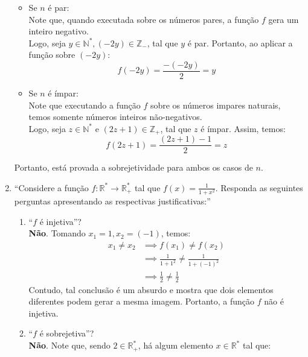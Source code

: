 \documentclass[13pt,letterpaper]{article}
\begin{document}
\begin{enumerate}
        \begin{itemize}
            \item Se $n$ é par: \\
            Note que, quando executada sobre os números pares, a função $f$ gera um inteiro negativo. \\
            Logo, seja $y \in \mathbb{N}^*, (-2y) \in \mathbb{Z}_-$, tal que $y$ é par. Portanto, ao aplicar a função sobre $(-2y)$:
            \begin{displaymath}
                f(-2y) = \frac{-(-2y)}{2} = y
            \end{displaymath}
            \item Se $n$ é ímpar: \\
            Note que executando a função $f$ sobre os números impares naturais, temos somente números inteiros não-negativos. \\
            Logo, seja $z \in \mathbb{N}^*$ e $(2z + 1) \in \mathbb{Z}_+$, tal que $z$ é ímpar. Assim, temos:
            \begin{displaymath}
                f(2z + 1) = \frac{(2z + 1) - 1}{2} = z
            \end{displaymath}
        \end{itemize}
        Portanto, está provada a sobrejetividade para ambos os casos de $n$.
    \item \enquote{Considere a função $f: \mathbb{R}^* \rightarrow \mathbb{R}^*_+$ tal que $f(x) = \frac{1}{1 + x^2}$. Responda as seguintes perguntas apresentando as respectivas justificativas:}
    \begin{enumerate}
        \item \enquote{$f$ é injetiva}? \\
        \textbf{Não}. Tomando $x_1 = 1, x_2 = (-1)$, temos:
        \begin{align*}
            x_1 \ne x_2 &\implies f(x_1) \ne f(x_2) \\ &\implies 
            \frac{1}{1 + 1^2} \ne \frac{1}{1 + (-1)^2} \\ &\implies
            \frac{1}{2} \ne \frac{1}{2}
        \end{align*}
        Contudo, tal conclusão é um absurdo e mostra que dois elementos diferentes podem gerar a mesma imagem. Portanto, a função $f$ não é injetiva.
        \item \enquote{$f$ é sobrejetiva}? \\
        \textbf{Não}. Note que, sendo $2 \in \mathbb{R}^*_+$, há algum elemento $x \in \mathbb{R}^*$ tal que:

\end{enumerate}
\end{enumerate}
\end{document}
